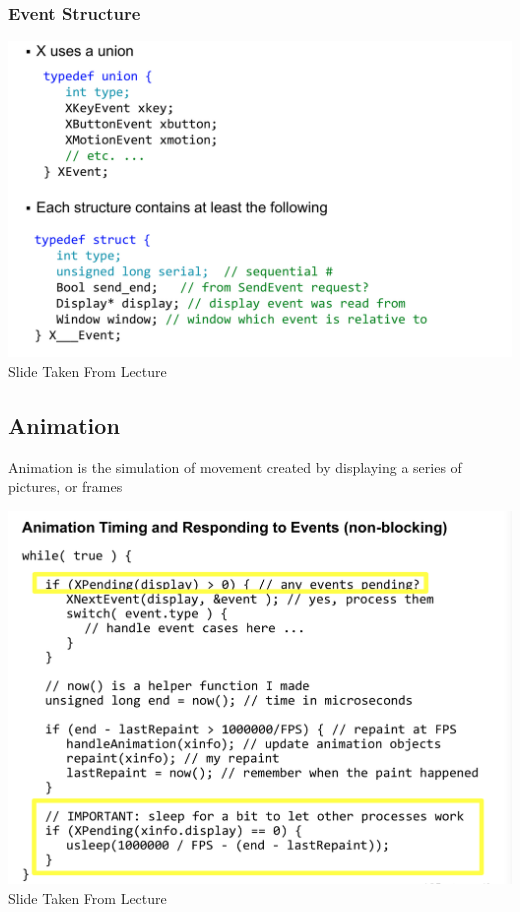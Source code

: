 \documentclass[twoside]{article}
\begin{document}
\subsubsection{Event Structure}
\begin{center}
\includegraphics[scale=0.3]{7}\\
Slide Taken From Lecture
\end{center}

\subsection{Animation}
Animation is the simulation of movement created by displaying a series of pictures, or frames

\begin{center}
\includegraphics[scale=0.2]{8}\\
Slide Taken From Lecture
\end{center}
\end{document}
